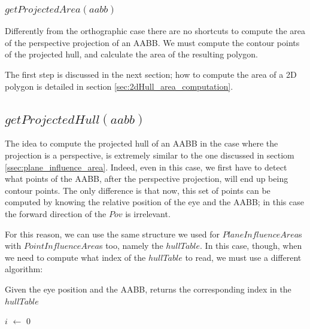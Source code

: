 \documentclass{PoliMi_MasterThesis}
\newcommand*\Let[2]{\State #1 $\gets$ #2}
\begin{document}
\subsubsection*{$getProjectedArea(aabb)$}
Differently from the orthographic case there are no shortcuts to compute the area of the perspective projection of an AABB. We must compute the contour points of the projected hull, and calculate the area of the resulting polygon.

The first step is discussed in the next section; how to compute the area of a 2D polygon is detailed in section \ref{sec:2dHull_area_computation}.

\subsection*{$getProjectedHull(aabb)$}
The idea to compute the projected hull of an AABB in the case where the projection is a perspective, is extremely similar to the one discussed in sectiom \ref{ssec:plane_influence_area}. Indeed, even in this case, we first have to detect what points of the AABB, after the perspective projection, will end up being contour points. The only difference is that now, this set of points can be computed by knowing the relative position of the eye and the AABB; in this case the forward direction of the $Pov$ is irrelevant. 

For this reason, we can use the same structure we used for $PlaneInfluenceArea$s with $PointInfluenceArea$s too, namely the $hullTable$. In this case, though, when we need to compute what index of the $hullTable$ to read, we must use a different algorithm:

\begin{algorithm}[H]
	\caption{Given the eye position and the AABB, returns the corresponding index in the $hullTable$}
	\begin{algorithmic}[1]
		\Let{$i$}{0}
		\State{$\textbf{if}\; eye.x < aabb.min.x \; \textbf{then} \; i = i | 1$}
		\State {}
		\EndFunction
	\end{algorithmic}
\end{algorithm} 
\end{document}
